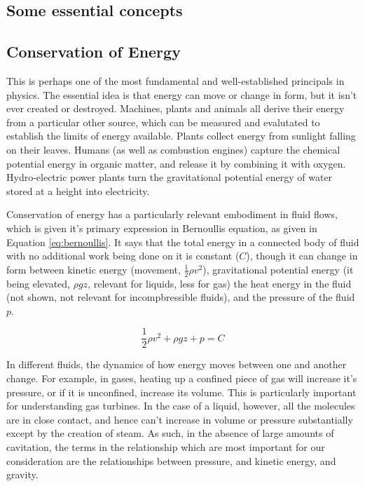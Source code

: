 \documentclass{article}\usepackage[]{graphicx}\usepackage[]{color}
\begin{document}
\begin{appendices}
\section{Some essential concepts}

\subsection{Conservation of Energy}

This is perhaps one of the most fundamental and well-established principals in physics.  The essential idea is that energy can move or change in form, but it isn't ever created or destroyed.  Machines, plants and animals all derive their energy from a particular other source, which can be measured and evalutated to establish the limits of energy available.  Plants collect energy from sunlight falling on their leaves. Humans (as well as combustion engines) capture the chemical potential energy in organic matter, and release it by combining it with oxygen.  Hydro-electric power plants turn the gravitational potential energy of water stored at a height into electricity.

Conservation of energy has a particularly relevant embodiment in fluid flows, which is given it's primary expression in Bernoullis equation, as given in Equation \ref{eq:bernoullis}.  It says that the total energy in a connected body of fluid with no additional work being done on it is constant ($C$), though it can change in form between kinetic energy (movement, $\frac{1}{2}\rho v^2$), gravitational potential energy (it being elevated, $\rho gz$, relevant for liquids, less for gas) the heat energy in the fluid (not shown, not relevant for incompbressible fluids), and the pressure of the fluid $p$.

\begin{equation}
\label{eq:bernoullis}
\frac{1}{2}\rho v^2 + \rho gz + p = C
\end{equation}

In different fluids, the dynamics of how energy moves between one and another change.  For example, in gases, heating up a confined piece of gas will increase it's pressure, or if it is unconfined, increase its volume. This is particularly important for understanding gas turbines. In the case of a liquid, however, all the molecules are in close contact, and hence can't increase in volume or pressure substantially except by the creation of steam. As such, in the absence of large amounts of cavitation, the terms in the relationship which are most important for our consideration are the relationships between pressure, and kinetic energy, and gravity.


\end{appendices}
\end{document}
